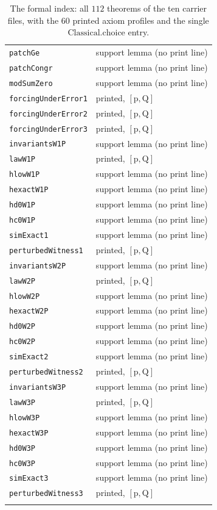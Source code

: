 \documentclass[11pt]{article}
\theoremstyle{plain}
\theoremstyle{definition}
\begin{document}
\begin{longtable}{p{} p{}}
\quad\texttt{patchGe} & support lemma (no print line)\\
\quad\texttt{patchCongr} & support lemma (no print line)\\
\quad\texttt{modSumZero} & support lemma (no print line)\\
\quad\texttt{forcingUnderError1} & printed, $[\mathrm{p},\mathrm{Q}]$\\
\quad\texttt{forcingUnderError2} & printed, $[\mathrm{p},\mathrm{Q}]$\\
\quad\texttt{forcingUnderError3} & printed, $[\mathrm{p},\mathrm{Q}]$\\
\quad\texttt{invariantsW1P} & support lemma (no print line)\\
\quad\texttt{lawW1P} & printed, $[\mathrm{p},\mathrm{Q}]$\\
\quad\texttt{hlowW1P} & support lemma (no print line)\\
\quad\texttt{hexactW1P} & support lemma (no print line)\\
\quad\texttt{hd0W1P} & support lemma (no print line)\\
\quad\texttt{hc0W1P} & support lemma (no print line)\\
\quad\texttt{simExact1} & support lemma (no print line)\\
\quad\texttt{perturbedWitness1} & printed, $[\mathrm{p},\mathrm{Q}]$\\
\quad\texttt{invariantsW2P} & support lemma (no print line)\\
\quad\texttt{lawW2P} & printed, $[\mathrm{p},\mathrm{Q}]$\\
\quad\texttt{hlowW2P} & support lemma (no print line)\\
\quad\texttt{hexactW2P} & support lemma (no print line)\\
\quad\texttt{hd0W2P} & support lemma (no print line)\\
\quad\texttt{hc0W2P} & support lemma (no print line)\\
\quad\texttt{simExact2} & support lemma (no print line)\\
\quad\texttt{perturbedWitness2} & printed, $[\mathrm{p},\mathrm{Q}]$\\
\quad\texttt{invariantsW3P} & support lemma (no print line)\\
\quad\texttt{lawW3P} & printed, $[\mathrm{p},\mathrm{Q}]$\\
\quad\texttt{hlowW3P} & support lemma (no print line)\\
\quad\texttt{hexactW3P} & support lemma (no print line)\\
\quad\texttt{hd0W3P} & support lemma (no print line)\\
\quad\texttt{hc0W3P} & support lemma (no print line)\\
\quad\texttt{simExact3} & support lemma (no print line)\\
\quad\texttt{perturbedWitness3} & printed, $[\mathrm{p},\mathrm{Q}]$\\
\hline
\caption{The formal index: all $112$ theorems of the ten carrier files, with the
$60$ printed axiom profiles and the single $\mathrm{Classical.choice}$ entry.}
\label{tab:index}
\end{longtable}
\end{document}

